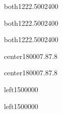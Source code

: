 \begin{WordParagraph}{both}{12}{22.5}{0}{0}{24}{0}{0}
\WordAutoSpaceOff
{}
\end{WordParagraph}

\begin{WordParagraph}{both}{12}{22.5}{0}{0}{24}{0}{0}
\WordAutoSpaceOff
\WordEmpty
\end{WordParagraph}

\begin{WordParagraph}{both}{12}{22.5}{0}{0}{24}{0}{0}
\WordAutoSpaceOff
\WordEmpty
\end{WordParagraph}

\begin{WordParagraph}{center}{18}{}{0}{0}{0}{7.8}{7.8}
\WordAutoSpaceOn
\WordEmpty
\end{WordParagraph}

\begin{WordParagraph}{center}{18}{}{0}{0}{0}{7.8}{7.8}
\WordAutoSpaceOn
\WordEmpty
\end{WordParagraph}

\begin{WordParagraph}{left}{15}{}{0}{0}{0}{0}{0}
\WordAutoSpaceOn
\WordEmpty
\end{WordParagraph}

\begin{WordParagraph}{left}{15}{}{0}{0}{0}{0}{0}
\WordAutoSpaceOn
\WordEmpty
\end{WordParagraph}
